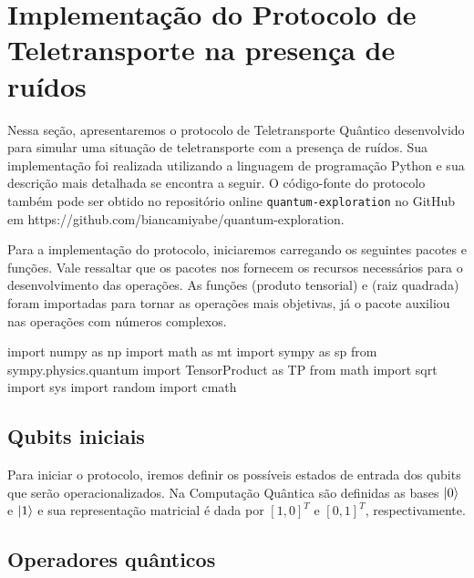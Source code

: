 
\chapter{Implementação do Protocolo de Teletransporte na presença de ruídos}\label{app:protocolo}

Nessa seção, apresentaremos o protocolo de Teletransporte Quântico desenvolvido para simular uma situação de teletransporte com a presença de ruídos. Sua implementação foi realizada utilizando a linguagem de programação Python e sua descrição mais detalhada se encontra a seguir. O código-fonte do protocolo também pode ser obtido no repositório online \texttt{quantum-exploration} no GitHub em \hypertarget{repositório}{https://github.com/biancamiyabe/quantum-exploration}.

Para a implementação do protocolo, iniciaremos carregando os seguintes pacotes e funções. Vale ressaltar que os pacotes nos fornecem os recursos necessários para o desenvolvimento das operações. As funções  (produto tensorial) e  (raiz quadrada) foram importadas para tornar as operações mais objetivas, já o pacote  auxiliou nas operações com números complexos.

\begin{pycode}
    import numpy as np
	import math as mt
	import sympy as sp
	from sympy.physics.quantum import TensorProduct as TP
	from math import sqrt
	import sys
	import random
	import cmath
\end{pycode}

\section{Qubits iniciais}\label{qubits-iniciais}

Para iniciar o protocolo, iremos definir os possíveis estados de entrada dos qubits que serão operacionalizados. Na Computação Quântica são definidas as bases \(\ket{0}\) e \(\ket{1}\) e sua representação matricial é dada por \([1, 0]^{T}\) e \([0, 1]^{T}\), respectivamente.

\section{Operadores quânticos}\label{operadores-quuxe2nticos}


